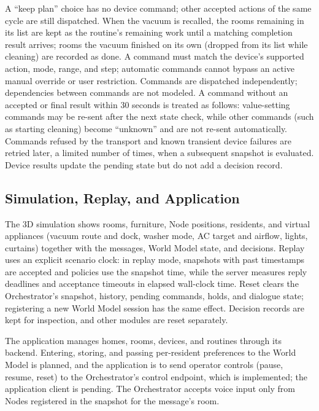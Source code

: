 \documentclass[conference]{IEEEtran}
\begin{document}
A ``keep plan'' choice has no device command; other accepted actions
of the same cycle are still dispatched. When the vacuum is recalled,
the rooms remaining in its list are kept as the routine's remaining
work until a matching completion result arrives; rooms the vacuum
finished on its own (dropped from its list while cleaning) are
recorded as done. A command must match the device's supported
action, mode, range, and step; automatic commands cannot bypass an
active manual override or user restriction. Commands are dispatched
independently; dependencies between commands are not modeled. A
command without an accepted or final result within 30 seconds is
treated as follows: value-setting commands may be re-sent after the
next state check, while other commands (such as starting cleaning)
become ``unknown'' and are not re-sent automatically. Commands
refused by the transport and known transient device failures are
retried later, a limited number of times, when a subsequent
snapshot is evaluated. Device results update the pending state but
do not add a decision record.

\subsection{Simulation, Replay, and Application}
\label{sec:sim}

The 3D simulation shows rooms, furniture, Node positions, residents,
and virtual appliances (vacuum route and dock, washer mode, AC
target and airflow, lights, curtains) together with the messages,
World Model state, and decisions. Replay uses an explicit scenario
clock: in replay mode, snapshots with past timestamps are accepted
and policies use the snapshot time, while the server measures reply
deadlines and acceptance timeouts in elapsed wall-clock time. Reset clears the Orchestrator's
snapshot, history, pending commands, holds, and dialogue state;
registering a new World Model session has the same effect. Decision
records are kept for inspection, and other modules are reset
separately.

The application manages homes, rooms, devices, and routines through
its backend. Entering, storing, and passing per-resident preferences
to the World Model is planned, and the application is to send
operator controls (pause, resume, reset) to the Orchestrator's
control endpoint, which is implemented; the application client is
pending. The Orchestrator accepts voice input only from Nodes
registered in the snapshot for the message's room.
\end{document}
